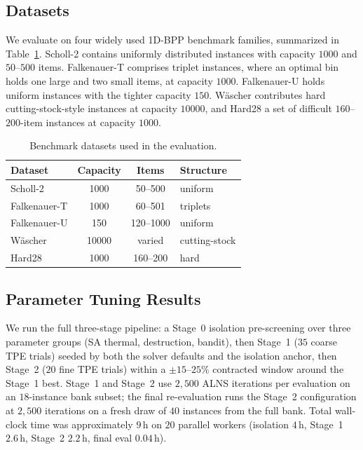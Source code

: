 \documentclass[conference]{IEEEtran}
\begin{document}
\subsection{Datasets}
We evaluate on four widely used 1D-BPP benchmark families, summarized in
Table~\ref{tab:datasets}. Scholl-2 contains uniformly distributed instances with
capacity $1000$ and $50$--$500$ items. Falkenauer-T comprises triplet instances,
where an optimal bin holds one large and two small items, at capacity $1000$.
Falkenauer-U holds uniform instances with the tighter capacity $150$. W\"ascher
contributes hard cutting-stock-style instances at capacity $10000$, and Hard28 a
set of difficult $160$--$200$-item instances at capacity $1000$.

\begin{table}[htbp]
	\caption{Benchmark datasets used in the evaluation.}
	\label{tab:datasets}
	\centering
	\begin{tabular}{l c c l}
		\hline
		\textbf{Dataset} & \textbf{Capacity} & \textbf{Items} & \textbf{Structure} \\
		\hline
		Scholl-2         & 1000              & 50--500        & uniform            \\
		Falkenauer-T     & 1000              & 60--501        & triplets           \\
		Falkenauer-U     & 150               & 120--1000      & uniform            \\
		W\"ascher        & 10000             & varied         & cutting-stock      \\
		Hard28           & 1000              & 160--200       & hard               \\
		\hline
	\end{tabular}
\end{table}

\subsection{Parameter Tuning Results}

We run the full three-stage pipeline: a Stage~0 isolation pre-screening over
three parameter groups (SA thermal, destruction, bandit), then Stage~1 ($35$
coarse TPE trials) seeded by both the solver defaults and the isolation
anchor, then Stage~2 ($20$ fine TPE trials) within a $\pm15$--$25\%$ contracted
window around the Stage~1 best. Stage~1 and Stage~2 use $2{,}500$ ALNS
iterations per evaluation on an $18$-instance bank subset; the final
re-evaluation runs the Stage~2 configuration at $2{,}500$ iterations on a
fresh draw of $40$ instances from the full bank. Total wall-clock time was
approximately $9$\,h on $20$ parallel workers (isolation $4$\,h, Stage~1
$2.6$\,h, Stage~2 $2.2$\,h, final eval $0.04$\,h).
\end{document}
